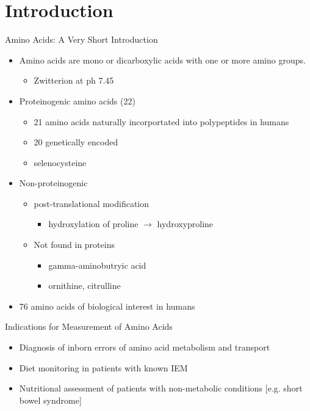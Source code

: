 \documentclass[presentation, smaller]{beamer}
\begin{document}
\section{Introduction}
\label{sec:orgheadline11}
\begin{frame}[label={sec:orgheadline1}]{Amino Acids: A Very Short Introduction}
\begin{itemize}
\item Amino acids are mono or dicarboxylic acids with one or more amino groups.
\begin{itemize}
\item Zwitterion at ph 7.45
\end{itemize}

\item Proteinogenic amino acids (22)
\begin{itemize}
\item 21 amino acids naturally incorportated into polypeptides in humans
\item 20 genetically encoded
\item selenocysteine
\end{itemize}

\item Non-proteinogenic
\begin{itemize}
\item post-translational modification
\begin{itemize}
\item hydroxylation of proline \(\to\) hydroxyproline
\end{itemize}
\item Not found in proteins
\begin{itemize}
\item gamma-aminobutryic acid
\item ornithine, citrulline
\end{itemize}
\end{itemize}

\item 76 amino acids of biological interest in humans
\end{itemize}
\end{frame}

\begin{frame}[label={sec:orgheadline2}]{Indications for Measurement of Amino Acids}
\begin{itemize}
\item Diagnosis of inborn errors of amino acid metabolism and transport
\item Diet monitoring in patients with known IEM
\item Nutritional assessment of patients with non-metabolic conditions [e.g. short bowel syndrome]
\end{itemize}
\end{frame}
\end{document}
